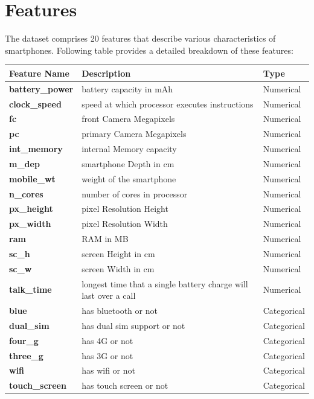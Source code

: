 \documentclass[12pt]{report}
\begin{document}
\section{Features}
The dataset comprises 20 features that describe various characteristics of smartphones. Following table provides a detailed breakdown of these features:
\begin{table}[H]
	\begin{tabular}{lll}
		\toprule
		\textbf{Feature Name}   & \textbf{Description}  & \textbf{Type}  \\
		\toprule
		\textbf{battery\_power} & battery capacity in mAh   & Numerical  \\
		\midrule
		\textbf{clock\_speed}   & speed at which processor executes instructions & Numerical \\
		\midrule
		\textbf{fc}             & front Camera Megapixels & Numerical \\
		\midrule
		\textbf{pc}             & primary Camera Megapixels & Numerical \\
		\midrule
		\textbf{int\_memory}    & internal Memory capacity & Numerical \\
		\midrule
		\textbf{m\_dep}         & smartphone Depth in cm & Numerical \\
		\midrule
		\textbf{mobile\_wt}     & weight of the smartphone & Numerical \\
		\midrule
		\textbf{n\_cores}       & number of cores in processor & Numerical \\
		\midrule
		\textbf{px\_height}     & pixel Resolution Height & Numerical \\
		\midrule
		\textbf{px\_width}      & pixel Resolution Width & Numerical \\
		\midrule
		\textbf{ram}            & RAM in MB & Numerical \\
		\midrule
		\textbf{sc\_h}          & screen Height in cm & Numerical \\
		\midrule
		\textbf{sc\_w}          & screen Width in cm & Numerical \\
		\midrule
		\textbf{talk\_time}     & longest time that a single battery charge will last over a call & Numerical \\
		\midrule
		\textbf{blue}           & has bluetooth or not  & Categorical   \\
		\midrule
		\textbf{dual\_sim}      & has dual sim support or not & Categorical \\
		\midrule
		\textbf{four\_g}        & has 4G or not & Categorical \\
		\midrule
		\textbf{three\_g}       & has 3G or not & Categorical \\
		\midrule
		\textbf{wifi}           & has wifi or not & Categorical \\
		\midrule
		\textbf{touch\_screen}  & has touch screen or not & Categorical \\
		\bottomrule
	\end{tabular}
\end{table}
\end{document}
